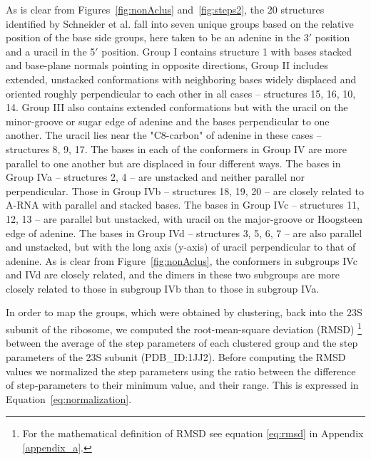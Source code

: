 As is clear  from Figures~\ref{fig:nonAclus} and~\ref{fig:steps2}, the
20 structures  identified by Schneider  et al. fall into  seven unique
groups based  on the relative position  of the base  side groups, here
taken to be an  adenine in the 3$'$ position and a  uracil in the 5$'$
position.   Group I  contains  structure {1}  with  bases stacked  and
base-plane normals pointing in  opposite directions, Group II includes
extended,  unstacked  conformations   with  neighboring  bases  widely
displaced  and oriented  roughly perpendicular  to each  other  in all
cases -- structures {15, 16, 10, 14}. Group III also contains extended
conformations but  with the uracil  on the minor-groove or  sugar edge
\cite{leontis1998}  of  adenine and  the  bases  perpendicular to  one
another.  The  uracil lies  near the "C8-carbon"  of adenine  in these
cases -- structures {8, 9, 17}. The bases in each of the conformers in
Group IV  are more parallel to  one another but are  displaced in four
different ways.   The bases in Group  IVa -- structures {2,  4} -- are
unstacked and neither parallel  nor perpendicular.  Those in Group IVb
-- structures  {18, 19,  20}  --  are closely  related  to A-RNA  with
parallel and stacked bases. The  bases in Group IVc -- structures {11,
  12,  13}  --  are  parallel   but  unstacked,  with  uracil  on  the
major-groove  or Hoogsteen  \cite{leontis1998} edge  of  adenine.  The
bases in Group IVd -- structures {3, 5, 6, 7} -- are also parallel and
unstacked, but with the long  axis (y-axis) of uracil perpendicular to
that  of adenine.   As  is clear  from Figure~\ref{fig:nonAclus},  the
conformers  in subgroups  IVc and  IVd  are closely  related, and  the
dimers in  these two  subgroups are more  closely related to  those in
subgroup IVb than to those in subgroup IVa.

In order  to map the groups,  which were obtained  by clustering, back
into the 23S subunit of the ribosome, we computed the root-mean-square
deviation (RMSD) \footnote{For the mathematical definition of RMSD see
  equation \ref{eq:rmsd} in Appendix \ref{appendix_a}.} between the
average of  the step parameters of  each clustered group  and the step
parameters of  the 23S  subunit (PDB\_ID:1JJ2).  Before  computing the
RMSD values we normalized the  step parameters using the ratio between
the difference  of step-parameters to  their minimum value,  and their
range.  This is expressed in Equation~\ref{eq:normalization}.

